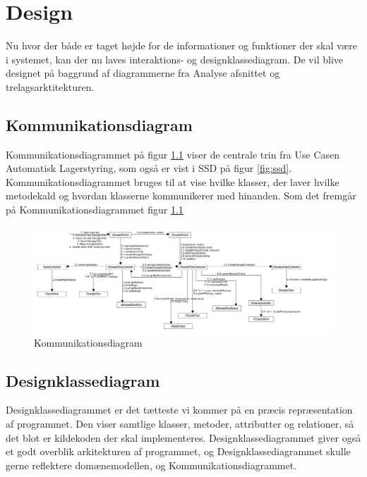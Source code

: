 \chapter{Design}\label{ch:design}
Nu hvor der både er taget højde for de informationer og funktioner der skal være i systemet, kan der nu laves interaktions- og designklassediagram. De vil blive designet på baggrund af diagrammerne fra Analyse afsnittet og trelagsarktitekturen. 

\section{Kommunikationsdiagram}
Kommunikationsdiagrammet\cite{Larman2004} på figur \ref{fig:Kommunikationsdiagram} viser de centrale trin fra Use Casen Automatisk Lagerstyring, som også er vist i SSD på figur \ref{fig:ssd}. Kommunikationsdiagrammet bruges til at vise hvilke klasser, der laver hvilke metodekald og hvordan klasserne kommunikerer med hinanden. 
Som det fremgår på Kommunikationsdiagrammet figur \ref{fig:Kommunikationsdiagram} 

\begin{landscape}
    \begin{figure}[p]
        \centering
        \includegraphics[width=0.8\hsize]{figures/design/Kommunikationsdiagram}
        \caption{Kommunikationsdiagram}
        \label{fig:Kommunikationsdiagram}
    \end{figure}
\end{landscape}

\section{Designklassediagram}
Designklassediagrammet er det tætteste vi kommer på en præcis repræsentation af programmet. Den viser samtlige klasser, metoder, attributter og relationer, så det blot er kildekoden der skal implementeres. Designklassediagrammet giver også et godt overblik arkitekturen af programmet, og Designklassediagrammet skulle gerne reflektere domænemodellen, og Kommunikationsdiagrammet.

